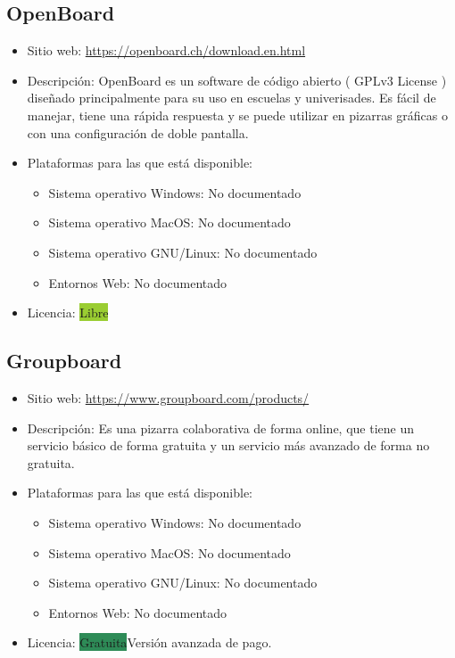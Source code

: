 \documentclass[11pt]{article}
\newcommand{\nodoc}{No documentado}
\newcommand{\libre}{\colorbox{YellowGreen}{Libre}}
\newcommand{\gratis}{\colorbox{SeaGreen}{Gratuita}}
\begin{document}
\subsection{OpenBoard}

\begin{itemize}
\item Sitio web: \url{https://openboard.ch/download.en.html}
\item Descripción: OpenBoard es un software de código abierto ( GPLv3 License ) diseñado principalmente para su uso en escuelas y univerisades. Es fácil de manejar, tiene una rápida respuesta y se puede utilizar en pizarras gráficas o con una configuración de doble pantalla.

\item Plataformas para las que está disponible:
  \begin{itemize}
  \item Sistema operativo Windows: \nodoc
  \item Sistema operativo MacOS: \nodoc
  \item Sistema operativo GNU/Linux: \nodoc
  \item Entornos Web: \nodoc
  \end{itemize}
\item Licencia: \libre
\end{itemize}


\subsection{Groupboard}

\begin{itemize}
\item Sitio web: \url{https://www.groupboard.com/products/}
\item Descripción: Es una pizarra colaborativa de forma online, que tiene un servicio básico de forma gratuita y un servicio más avanzado de forma no gratuita.
\item Plataformas para las que está disponible:
  \begin{itemize}
  \item Sistema operativo Windows: \nodoc
  \item Sistema operativo MacOS: \nodoc
  \item Sistema operativo GNU/Linux: \nodoc
  \item Entornos Web: \nodoc
  \end{itemize}
\item Licencia: \gratis Versión avanzada de pago.
\end{itemize}
\end{document}
